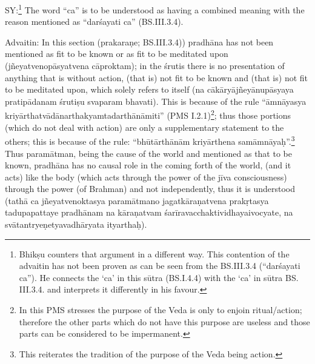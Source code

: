 \textbf{}



SY:\footnote{Bhikṣu counters that argument in a different way. This contention of the advaitin has not been  proven as can be seen from the BS.III.3.4 (“darśayati ca”). He connects the ‘ca’ in this sūtra (BS.I.4.4) with the ‘ca’ in sūtra BS. III.3.4. and interprets it differently in his favour. }  The word “ca” is to be understood as having a combined meaning with the reason mentioned as “darśayati ca” (BS.III.3.4). 

Advaitin: In this section (prakaraṇe; BS.III.3.4)) pradhāna has not been mentioned as fit to be known or as fit to be meditated upon (jñeyatvenopāsyatvena cāproktam); in the śrutis there is no presentation of anything that is without action, (that is) not fit to be known and (that is) not fit to be meditated upon, which solely refers to itself (na cākāryājñeyānupāsyaya pratipādanam śrutiṣu svaparam bhavati). This is because of the rule “āmnāyasya kriyārthatvādānarthakyamtadarthā\-nāmiti” (PMS I.2.1)\footnote{In this PMS stresses the purpose of the Veda is only to enjoin ritual/action; therefore the other parts which do not have this purpose are useless and those parts can be considered to be impermanent.}; thus those portions (which do not deal with action) are only a supplementary statement to the others; this is because of the rule: “bhūtārthānām kriyārthena samāmnāyaḥ”.\footnote{This reiterates the tradition of the purpose of the Veda being action.} Thus paramātman, being the cause of the world  and mentioned as that to be known, pradhāna has no causal role in the coming forth of the world, (and it acts) like the body (which acts through the power of the jīva consciousness) through the power (of Brahman) and not independently, thus it is understood (tathā ca jñeyatvenoktasya paramātmano jagat\-kāraṇatvena prakṛtasya tadupapattaye pradhānam na kāraṇatvam  śarī\-ravacchaktividhayaivocyate, na svātantryeṇetyavadhāryata ityarthaḥ).

